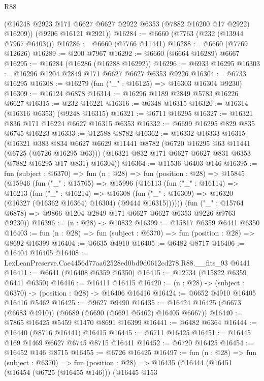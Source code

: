 \begin{lexlean}{R88}
\begin{coremodule}
        (@16248 @2923 @171 @6627 @6627 @2922 @6353 (@7882 @16200 @17 @2922) @16209))
      (@9206 @16121 @2921))
@16284 := @6660 (@7763 (@232 (@13944 @7967 @6403)))
@16286 := @6660 (@7766 @11441)
@16288 := @6660 (@7769 @12626)
@16289 := @200 @7967
@16292 := @6660 (@6664 @16289) @6667
@16295 := @16284 (@16286 (@16288 @16292))
@16296 := @6933 @16295
@16303 := @16296 @1204 @2849 @171 @6627 @6627 @6353 @9226
@16304 := @6733 @16295
@16308 := @16279 (fun ("_" : @16125) => @16303 @16304 @9230)
@16309 := @16124 @6878
@16314 := @16296 @1189 @2849 @5783 @16226 @6627
@16315 := @232 @16221
@16316 := @6348 @16315
@16320 := @16314 (@16316 @6353) (@9248 @16315)
@16321 := @6711 @16295
@16327 := @16321 @836 @171 @16224 @6627 @16315 @6353
@16332 := @6699 @16295 @829 @835 @6745 @16223
@16333 := @12588 @8782
@16362 := @16332
    @16333
    @16315
    (@16321
      @383
      @834
      @6627
      @6629
      @11441
      @8782
      (@6720 @16295 @63 @11441 (@6725 (@6726 @16295 @63)))
      (@16321 @832 @171 @6627 @6627 @831 @6353 (@7882 @16295 @17 @831) @16304))
@16364 := @11536 @6403 @146
@16395 := fun (subject : @6370) =>
  fun (n : @28) =>
  fun (position : @28) =>
  @15845
    (@15946
      (fun ("_" : @15765) =>
      @15996
        (@16113
          (fun ("_" : @16114) =>
          @16213
            (fun ("_" : @16214) =>
            @16308 (fun ("_" : @16309) => @16320 (@16327 (@16362 @16364) @16304) (@9444 @16315))))))
      (fun ("_" : @15764 @6878) => @9866 @1204 @2849 @171 @6627 @6627 @6353 @9226 @9763 @9230))
@16396 := (n : @28) -> @10832
@16399 := @15817 @6359 @6441 @6350
@16403 := fun (n : @28) => fun (subject : @6370) => fun (position : @28) => @8692 @16399
@16404 := @6635 @4910
@16405 := @6482 @8717
@16406 := @16404 @16405
@16408 := LexLeanPreserve.Cae4456d77aa62528ed0bd9d0612cd278.R88.__fits_93 @6441
@16411 := @6641 (@16408 @6359 @6350)
@16415 := @12734 (@15822 @6359 @6441 @6350)
@16416 := @16411 @16415
@16420 := (n : @28) -> (subject : @6370) -> (position : @28) -> @16406 @16416
@16424 := @6652 @4910 @16405 @16416 @5462
@16425 := @9627 @9490
@16435 := @16424 @16425 (@6673 (@6683 @4910)) (@6689 (@6690 (@6691 @5462) @16405 @6667))
@16440 := @7865 @16425 @5459 @1470 @8691 @16399
@16441 := @6482 @6364
@16444 := @16440 (@8716 @16441) @16415
@16445 := @6711 @16425
@16451 := @16445 @169 @1469 @6627 @6745 @8715 @16441
@16452 := @6720 @16425
@16454 := @16452 @146 @8715
@16455 := @6726 @16425
@16497 := fun (n : @28) =>
  fun (subject : @6370) =>
  fun (position : @28) =>
  @16435
    (@16444
      (@16451
        (@16454 (@6725 (@16455 @146)))
        (@16445
          @153

\end{coremodule}
\end{lexlean}

